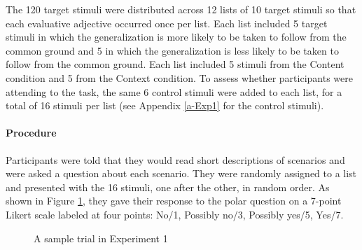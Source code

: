 \documentclass[11pt,fleqn]{article}
\newcommand{\6}{\mbox{$[\hspace*{-.6mm}[$}}
\newcommand{\9}{\mbox{$]\hspace*{-.6mm}]$}}
\begin{document}
The 120 target stimuli were distributed across 12 lists of 10 target stimuli so that each evaluative adjective occurred once per list. Each list included 5 target stimuli in which the generalization is more likely to be taken to follow from the common ground and 5 in which the generalization is less likely to be taken to follow from the common ground. Each list included 5 stimuli from the Content condition and 5 from the Context condition. To assess whether participants were attending to the task, the same 6 control stimuli were added to each list, for a total of 16 stimuli per list (see Appendix \ref{a-Exp1} for the control stimuli). 

\paragraph{Procedure}

Participants were told that they would read short descriptions of scenarios and were asked a question about each scenario. They were randomly assigned to a list and presented with the 16 stimuli, one after the other, in random order. As shown in Figure \ref{f-trial-exp1}, they gave their response to the polar question on a 7-point Likert scale labeled at four points: No/1, Possibly
no/3, Possibly yes/5, Yes/7. 

\begin{figure}[h!]
\centering


\caption{A sample trial in Experiment 1}\label{f-trial-exp1}
\end{figure}
\end{document}
